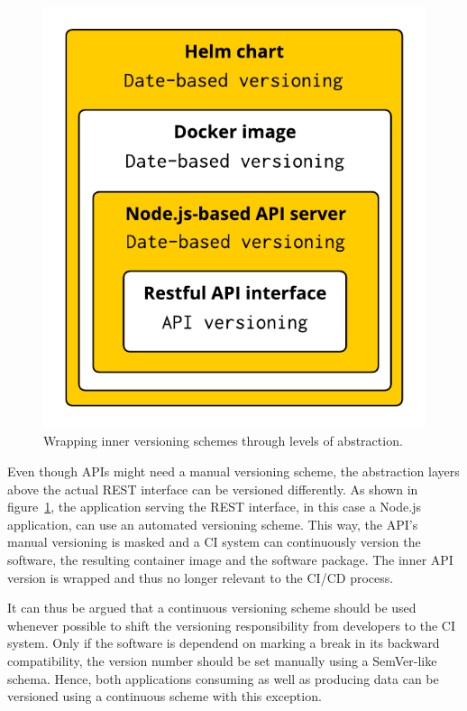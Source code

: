 \begin{figure}[H]
\begin{center}
  \includegraphics[scale=0.7]{images/figures/version_wrapping.pdf}
\end{center}
\caption{Wrapping inner versioning schemes through levels of abstraction.}%
\label{fig:version_wrapping}
\end{figure}

Even though \acp{API} might need a manual versioning scheme, the abstraction
layers above the actual \ac{REST} interface can be versioned differently. As
shown in figure~\ref{fig:version_wrapping}, the application serving the
\ac{REST} interface, in this case a Node.js application, can use an automated
versioning scheme. This way, the \ac{API}'s manual versioning is masked and a
\ac{CI} system can continuously version the software, the resulting container
image and the software package. The inner \ac{API} version is wrapped and thus
no longer relevant to the \ac{CI}/\ac{CD} process.

It can thus be argued that a continuous versioning scheme should be used
whenever possible to shift the versioning responsibility from developers to the
\ac{CI} system. Only if the software is dependend on marking a break in its
backward compatibility, the version number should be set manually using a
SemVer-like schema. Hence, both applications consuming as well as producing
data can be versioned using a continuous scheme with this exception.

